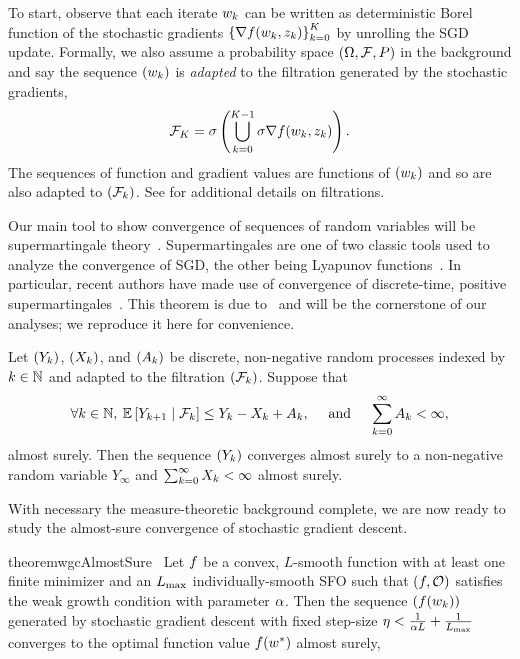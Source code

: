 To start, observe that each iterate \( \w_k \) can be written as deterministic Borel function of the stochastic gradients \( \cbr{\grad(\wk, \zk)}_{\iter=0}^{K} \) by unrolling the \ac{SGD} update.
Formally, we also assume a probability space \( \rbr{\Omega,  \calF, P} \) in the background and say the sequence \( \seq{\wk} \) is \emph{adapted} to the filtration generated by the stochastic gradients,
\begin{align*}
    \calF_K = \sigma \rbr{\bigcup_{\iter = 0}^{K-1} \sigma \grad(\wk, \zk)}.
\end{align*}
The sequences of function and gradient values are functions of \( \seq{\wk} \) and so are also adapted to \( \seq{\calF_\iter} \).
See \citet{ccinlar2011probability} for additional details on filtrations.

Our main tool to show convergence of sequences of random variables will be supermartingale theory~\citep{ccinlar2011probability}.
Supermartingales are one of two classic tools used to analyze the convergence of \ac{SGD}, the other being Lyapunov functions~\citep{bertsekas2000gradient}.
In particular, recent authors have made use of convergence of discrete-time, positive supermartingales~\citep{bertsekas2011incremental, nguyen2018sgd}.
This theorem is due to~\citet{neveu1975discrete} and will be the cornerstone of our analyses; we reproduce it here for convenience.

\begin{theorem}\label{thm:positive_supermartingales}
    Let \( \seq{Y_\iter} \), \( \seq{X_\iter} \), and \( \seq{A_\iter} \) be discrete, non-negative random processes indexed by \( \iter \in \bbN \) and adapted to the filtration \( \seq{\calF_\iter} \).
    Suppose that
    \begin{align*}
        \forall \iter \in \bbN, \: \E \sbr{Y_{\iter+1} \mid \calF_\iter} \leq Y_\iter - X_\iter + A_\iter,
        \quad \text{ and } \quad 
        \sum_{k=0}^{\infty} A_\iter < \infty,
    \end{align*}
    almost surely.
    Then the sequence \( \seq{Y_\iter} \) converges almost surely to a non-negative random variable \( Y_\infty \) and \( \sum_{k=0}^{\infty} X_\iter < \infty \) almost surely.
\end{theorem}
\noindent With necessary the measure-theoretic background complete, we are now ready to study the almost-sure convergence of stochastic gradient descent.

\begin{restatable}{theorem}{wgcAlmostSure}~\label{thm:wgc-almost-sure}
    Let \( \f \) be a convex, \( L \)-smooth function with at least one finite minimizer and \oracle{} an \( \Lmax \) individually-smooth \ac{SFO} such that \( \rbr{f, \oracle{}} \) satisfies the weak growth condition with parameter \( \wgc \).
Then the sequence \( \seq{f(\wk)} \) generated by stochastic gradient descent with fixed step-size \( \eta < \frac{1}{\wgc L} + \frac{1}{\Lmax} \) converges to the optimal function value \( f(\wopt) \) almost surely,
\end{restatable}

